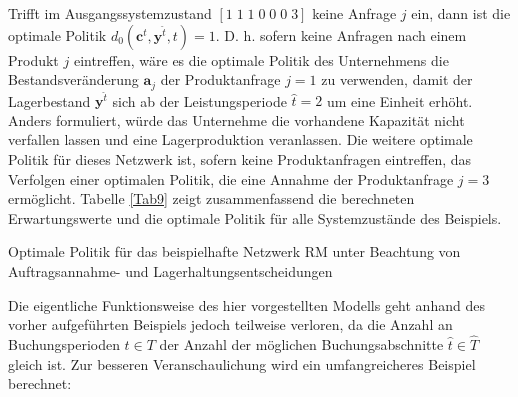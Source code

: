Trifft im Ausgangssystemzustand $[1\;1\;1\;0\;0\;0\;3]$ keine Anfrage $j$ ein, dann ist die optimale Politik $d_{0}({\textbf{c}^{\hat t},\textbf{y}^{\hat t}, t})=1$. D. h. sofern keine Anfragen nach einem Produkt $j$ eintreffen, wäre es die optimale Politik des Unternehmens die Bestandsveränderung $\textbf{a}_j$ der Produktanfrage $j=1$ zu verwenden, damit der Lagerbestand $\textbf{y}^{\hat t}$ sich ab der Leistungsperiode $\hat{t}=2$ um eine Einheit erhöht. Anders formuliert, würde das Unternehme die vorhandene Kapazität nicht verfallen lassen und eine Lagerproduktion veranlassen. Die weitere optimale Politik für dieses Netzwerk ist, sofern keine Produktanfragen eintreffen, das Verfolgen einer optimalen Politik, die eine Annahme der Produktanfrage $j=3$ ermöglicht. Tabelle \ref{Tab9} zeigt zusammenfassend die berechneten Erwartungswerte und die optimale Politik für alle Systemzustände des Beispiels.

\begin{table}
\begin{footnotesize}
     \caption{Optimale Politik für das beispielhafte Netzwerk RM unter Beachtung von Auftragsannahme- und Lagerhaltungsentscheidungen} \label{Tab9}
    \vspace*{3mm}
        \begin{center}
      \end{center}
    \begin{center}
      \end{center}
\end{footnotesize}
\end{table}

Die eigentliche Funktionsweise des hier vorgestellten Modells geht anhand des vorher aufgeführten Beispiels jedoch teilweise verloren, da die Anzahl an Buchungsperioden $t\in T$ der Anzahl der möglichen Buchungsabschnitte $\hat{t}\in\hat{T}$ gleich ist. Zur besseren Veranschaulichung wird ein umfangreicheres Beispiel berechnet:

